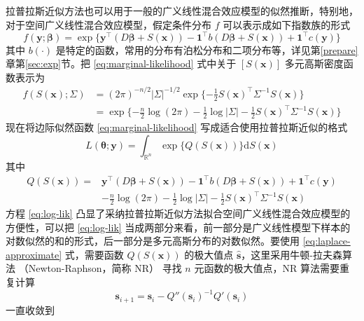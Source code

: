 \documentclass[12pt,a4paper,UTF8,twoside]{book}
\theoremstyle{definition}
\theoremstyle{definition}
\theoremstyle{definition}
\theoremstyle{remark}
\begin{document}
拉普拉斯近似方法也可以用于一般的广义线性混合效应模型的似然推断，特别地，对于空间广义线性混合效应模型，假定条件分布
\(f\) 可以表示成如下指数族的形式 \begin{equation}
f(\mathbf{y};\boldsymbol{\beta})  = \exp\{\mathbf{y}^{\top} (D\boldsymbol{\beta} + S(\mathbf{x})) - \mathbf{1}^{\top} b( D\boldsymbol{\beta} + S(\mathbf{x})) + \mathbf{1}^{\top} c(\mathbf{y}) \}  \label{eq:exponential-family}
\end{equation} \noindent 其中 \(b(\cdot)\)
是特定的函数，常用的分布有泊松分布和二项分布等，详见第\ref{prepare}章第\ref{sec:exp}节。把
\eqref{eq:marginal-likelihood} 式中关于 \([S(\mathbf{x})]\)
多元高斯密度函数表示为 \begin{align}
f(S(\mathbf{x});\Sigma) & = (2\pi)^{-n/2}|\Sigma|^{-1/2} \exp\{ -\frac{1}{2}S(\mathbf{x})^{\top} \Sigma^{-1} S(\mathbf{x}) \} \\
                      & = \exp\{ - \frac{n}{2}\log (2\pi) -\frac{1}{2}\log |\Sigma|  -\frac{1}{2}S(\mathbf{x})^{\top} \Sigma^{-1} S(\mathbf{x}) \} \label{eq:multi-gaussian-dist}
\end{align} \noindent 现在将边际似然函数 \eqref{eq:marginal-likelihood}
写成适合使用拉普拉斯近似的格式 \begin{equation}
L(\boldsymbol{\theta};\mathbf{y}) = \int_{\mathbb{R}^n} \exp\{Q(S(\mathbf{x}))\} \mathrm{d}S(\mathbf{x}) 
\end{equation} \noindent 其中 \begin{equation}
\begin{aligned}
Q(S(\mathbf{x})) ={} &  \mathbf{y}^{\top} (D \boldsymbol{\beta} + S(\mathbf{x})) - \mathbf{1}^{\top} b(D \boldsymbol{\beta} + S(\mathbf{x})) + \mathbf{1}^{\top}c(\mathbf{y}) \\
                   & - \frac{n}{2}\log (2\pi) -\frac{1}{2}\log |\Sigma| -\frac{1}{2}S(\mathbf{x})^{\top} \Sigma^{-1} S(\mathbf{x})
\end{aligned} \label{eq:log-lik}
\end{equation} \noindent 方程 \eqref{eq:log-lik}
凸显了采纳拉普拉斯近似方法拟合空间广义线性混合效应模型的方便性，可以把
\eqref{eq:log-lik}
当成两部分来看，前一部分是广义线性模型下样本的对数似然的和的形式，后一部分是多元高斯分布的对数似然。要使用
\eqref{eq:laplace-approximate} 式，需要函数 \(Q(S(\mathbf{x}))\)
的极大值点 \(\hat{\mathbf{s}}\)，这里采用牛顿-拉夫森算法
（Newton-Raphson，简称 NR） 寻找 \(n\) 元函数的极大值点，NR
算法需要重复计算 \begin{equation}
\mathbf{s}_{i+1} = \mathbf{s}_{i} - Q''(\mathbf{s}_{i})^{-1}Q'(\mathbf{s}_{i}) 
\end{equation} \noindent 一直收敛到
\end{document}
